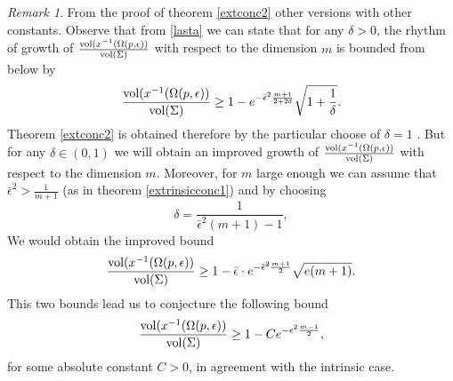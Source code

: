 \documentclass{amsart}
\theoremstyle{definition}
\theoremstyle{remark}
\newtheorem{remark}[theorem]{Remark}
\begin{document}
\begin{remark}
    From the proof of theorem \ref{extconc2} other versions with other constants. Observe that from \eqref{lasta} we can  state that for any $\delta>0$, the rhythm of growth of $\frac{{\rm vol}(x^{-1}(\Omega(p,\epsilon))}{{\rm vol}(\Sigma)}$ with respect to  the dimension $m$ is bounded from below by
    $$
    \frac{{\rm vol}(x^{-1}(\Omega(p,\epsilon))}{{\rm vol}(\Sigma)}\geq 1-e^{-\bar\epsilon^2\frac{m+1}{2+2\delta}}\sqrt{1+\frac{1}{\delta}}.
    $$
    Theorem \ref{extconc2} is obtained therefore by the particular choose of $\delta=1$ . But for any $\delta\in (0,1)$  we will obtain an improved growth of $\frac{{\rm vol}(x^{-1}(\Omega(p,\epsilon))}{{\rm vol}(\Sigma)}$ with respect to  the dimension $m$. Moreover, for  $m$ large enough we can assume that $\bar \epsilon^2>\frac{1}{m+1}$ (as in theorem \ref{extrinsicconc1}) and by choosing
    $$
    \delta=\frac{1}{\bar\epsilon^2(m+1)-1},
    $$
    We would obtain the improved bound
$$
    \frac{{\rm vol}(x^{-1}(\Omega(p,\epsilon))}{{\rm vol}(\Sigma)}\geq 1-\bar \epsilon \cdot e^{-\bar\epsilon^2\frac{m+1}{2}}\sqrt{e(m+1)}.
    $$
    This two bounds lead us to conjecture the following bound 
    $$
    \frac{{\rm vol}(x^{-1}(\Omega(p,\epsilon))}{{\rm vol}(\Sigma)}\geq 1-C e^{-\epsilon^2\frac{m-1}{2}},
    $$
    for some absolute constant $C>0$, in agreement with the intrinsic case.
\end{remark}


\end{document}
